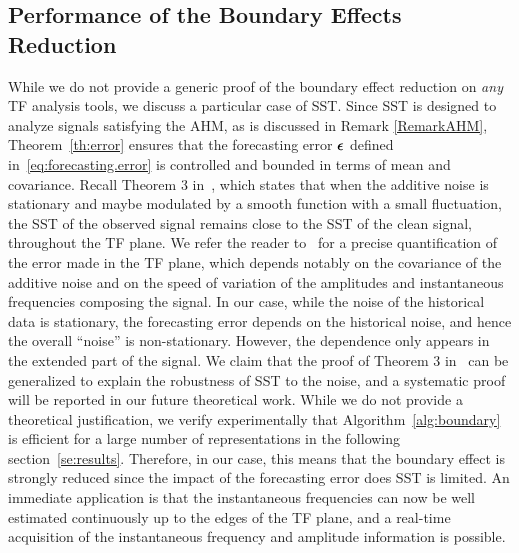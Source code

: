 \subsection{Performance of the Boundary Effects Reduction}
\label{sse:perf.BoundEffRed}
While we do not provide a generic proof of the boundary effect reduction on {\em any} TF analysis tools, we discuss a particular case of SST. Since SST is designed to analyze signals satisfying the AHM, as is discussed in Remark \ref{RemarkAHM}, Theorem~\ref{th:error} ensures that the forecasting error $\boldsymbol{\epsilon}$ defined in~\eqref{eq:forecasting.error} is controlled and bounded in terms of mean and covariance. Recall Theorem 3 in~\cite{Chen14nonparametric}, which states that when the additive noise is stationary and maybe modulated by a smooth function with a small fluctuation, the SST of the observed signal remains close to the SST of the clean signal, throughout the TF plane. 
%
We refer the reader to~\cite{Chen14nonparametric} for a precise quantification of the error made in the TF plane, which depends notably on the covariance of the additive noise and on the speed of variation of the amplitudes and instantaneous frequencies composing the signal. 
%
In our case, while the noise of the historical data is stationary, the forecasting error depends on the historical noise, and hence the overall ``noise'' is non-stationary. However, the dependence only appears in the extended part of the signal. We claim that the proof of Theorem 3 in~\cite{Chen14nonparametric} can be generalized to explain the robustness of SST to the noise, and a systematic proof will be reported in our future theoretical work. While we do not provide a theoretical justification, we verify experimentally that Algorithm~\ref{alg:boundary} is efficient for a large number of representations in the following section~\ref{se:results}. 
%
Therefore, in our case, this means that the boundary effect is strongly reduced since the impact of the forecasting error does SST is limited. An immediate application is that the instantaneous frequencies can now be well estimated continuously up to the edges of the TF plane, and a real-time acquisition of the instantaneous frequency and amplitude information is possible.